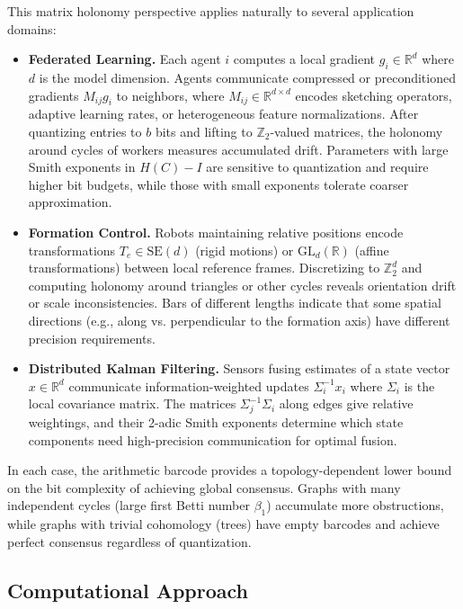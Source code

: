 \documentclass[11pt]{amsart}
\theoremstyle{plain}
\theoremstyle{definition}
\begin{document}
This matrix holonomy perspective applies naturally to several application domains:
\begin{itemize}
\item \textbf{Federated Learning.} Each agent $i$ computes a local gradient $g_i \in \mathbb{R}^d$ where $d$ is the model dimension. Agents communicate compressed or preconditioned gradients $M_{ij} g_i$ to neighbors, where $M_{ij} \in \mathbb{R}^{d \times d}$ encodes sketching operators, adaptive learning rates, or heterogeneous feature normalizations. After quantizing entries to $b$ bits and lifting to $\mathbb{Z}_2$-valued matrices, the holonomy around cycles of workers measures accumulated drift. Parameters with large Smith exponents in $H(C) - I$ are sensitive to quantization and require higher bit budgets, while those with small exponents tolerate coarser approximation.

\item \textbf{Formation Control.} Robots maintaining relative positions encode transformations $T_e \in \mathrm{SE}(d)$ (rigid motions) or $\mathrm{GL}_d(\mathbb{R})$ (affine transformations) between local reference frames. Discretizing to $\mathbb{Z}_2^d$ and computing holonomy around triangles or other cycles reveals orientation drift or scale inconsistencies. Bars of different lengths indicate that some spatial directions (e.g., along vs. perpendicular to the formation axis) have different precision requirements.

\item \textbf{Distributed Kalman Filtering.} Sensors fusing estimates of a state vector $x \in \mathbb{R}^d$ communicate information-weighted updates $\Sigma_i^{-1} x_i$ where $\Sigma_i$ is the local covariance matrix. The matrices $\Sigma_j^{-1} \Sigma_i$ along edges give relative weightings, and their 2-adic Smith exponents determine which state components need high-precision communication for optimal fusion.
\end{itemize}

In each case, the arithmetic barcode provides a topology-dependent lower bound on the bit complexity of achieving global consensus. Graphs with many independent cycles (large first Betti number $\beta_1$) accumulate more obstructions, while graphs with trivial cohomology (trees) have empty barcodes and achieve perfect consensus regardless of quantization.

\subsection{Computational Approach}
\label{ssec:computation-consensus}
\end{document}
